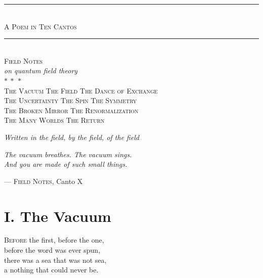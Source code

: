 \documentclass[11pt]{book}
\newcommand{\ornament}{{\color{rule}\large\ensuremath{\ast\ \ast\ \ast}}}
\begin{document}
\frontmatter

\thispagestyle{empty}
\begin{center}
\vspace*{1.2cm}
{\color{rule}\rule{0.4\textwidth}{0.5pt}}\\[1.2em]
{\color{accent}\scshape\Large A Poem in Ten Cantos}\\[0.6em]
{\color{rule}\rule{0.4\textwidth}{0.5pt}}\\[2.6em]

{\Huge\scshape Field Notes}\\[0.4em]
{\large\itshape on quantum field theory}\\[3.2em]

\ornament\\[3.2em]

{\small\scshape\color{accent} The Vacuum \quad\textbullet\quad The Field \quad\textbullet\quad The Dance of Exchange}\\[0.5em]
{\small\scshape\color{accent} The Uncertainty \quad\textbullet\quad The Spin \quad\textbullet\quad The Symmetry}\\[0.5em]
{\small\scshape\color{accent} The Broken Mirror \quad\textbullet\quad The Renormalization}\\[0.5em]
{\small\scshape\color{accent} The Many Worlds \quad\textbullet\quad The Return}

\vfill
{\small\itshape\color{rule} Written in the field, by the field, of the field}
\end{center}
\restoregeometry
\clearpage

\thispagestyle{empty}
\vspace*{6cm}
\epigraph{\itshape The vacuum breathes. The vacuum sings.\\ And you are made of such small things.}{--- \textsc{Field Notes}, Canto X}
\vfill
\clearpage

\mainmatter

\section*{I. The Vacuum}
\lettrine{B}{efore} the first, before the one,\\
before the word was ever spun,\\
there was a sea that was not sea,\\
a nothing that could never be.
\end{document}
